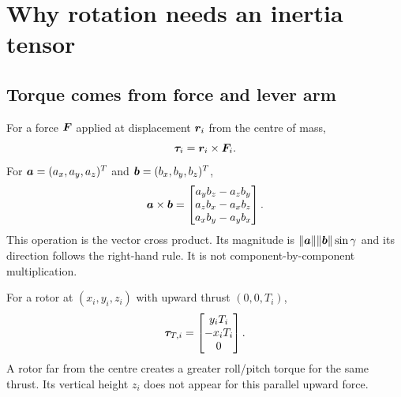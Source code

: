 \chapter{Why rotation needs an inertia tensor}
\section{Torque comes from force and lever arm}
For a force $\bm{F}$ applied at displacement $\bm{r}_i$ from the centre of mass,
\begin{equation}
\bm{\tau}_i=\bm{r}_i\times\bm{F}_i.
\end{equation}
For $\bm{a}=(a_x,a_y,a_z)^T$ and $\bm{b}=(b_x,b_y,b_z)^T$,
\begin{equation}
\bm{a}\times\bm{b}=
\begin{bmatrix}a_yb_z-a_zb_y\\a_zb_x-a_xb_z\\a_xb_y-a_yb_x\end{bmatrix}.
\end{equation}
This operation is the vector cross product. Its magnitude is
$\|\bm{a}\|\|\bm{b}\|\sin\gamma$ and its direction follows the right-hand rule.
It is not component-by-component multiplication.

For a rotor at $(x_i,y_i,z_i)$ with upward thrust $(0,0,T_i)$,
\begin{equation}
\bm{\tau}_{T,i}=
\begin{bmatrix}y_iT_i\\-x_iT_i\\0\end{bmatrix}.
\end{equation}
A rotor far from the centre creates a greater roll/pitch torque for the same
thrust. Its vertical height $z_i$ does not appear for this parallel upward force.

